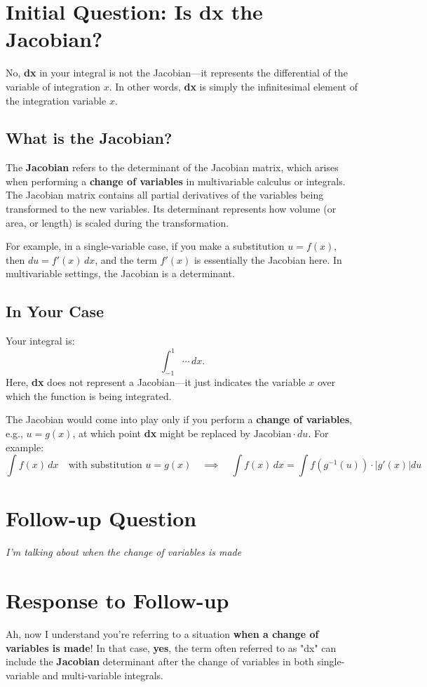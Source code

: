\documentclass[12pt]{article}
\begin{document}
\section*{Initial Question: Is dx the Jacobian?}

No, \textbf{dx} in your integral is not the Jacobian—it represents the differential of the variable of integration $x$. In other words, \textbf{dx} is simply the infinitesimal element of the integration variable $x$.

\subsection*{What is the Jacobian?}
The \textbf{Jacobian} refers to the determinant of the Jacobian matrix, which arises when performing a \textbf{change of variables} in multivariable calculus or integrals. The Jacobian matrix contains all partial derivatives of the variables being transformed to the new variables. Its determinant represents how volume (or area, or length) is scaled during the transformation.

For example, in a single-variable case, if you make a substitution $u = f(x)$, then $du = f'(x) \, dx$, and the term $f'(x)$ is essentially the Jacobian here. In multivariable settings, the Jacobian is a determinant.

\subsection*{In Your Case}
Your integral is:
\[
\int_{-1}^1 \cdots \, dx.
\]
Here, \textbf{dx} does not represent a Jacobian—it just indicates the variable $x$ over which the function is being integrated.

The Jacobian would come into play only if you perform a \textbf{change of variables}, e.g., $u = g(x)$, at which point \textbf{dx} might be replaced by $\text{Jacobian} \cdot du$. For example:
\[
\int f(x) \, dx \quad \text{with substitution $u = g(x)$} \quad \implies \quad \int f(x) \, dx = \int f(g^{-1}(u)) \cdot |g'(x)|  du
\]

\section*{Follow-up Question}
\textit{I'm talking about when the change of variables is made}

\section*{Response to Follow-up}
Ah, now I understand you're referring to a situation \textbf{when a change of variables is made}! In that case, \textbf{yes}, the term often referred to as "dx" can include the \textbf{Jacobian} determinant after the change of variables in both single-variable and multi-variable integrals.
\end{document}
